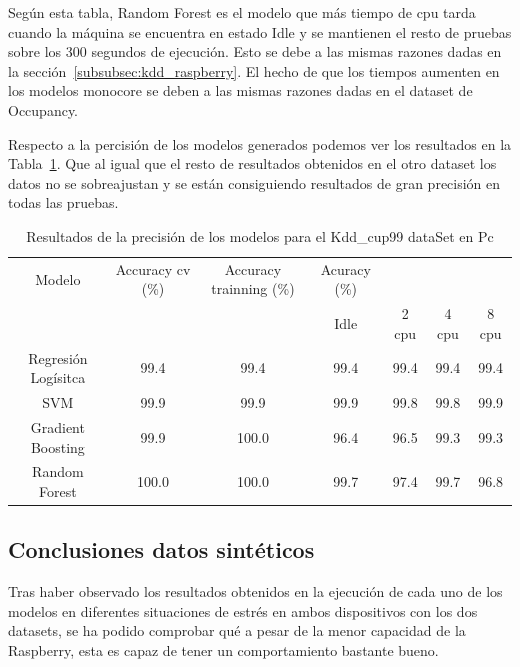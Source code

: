 \documentclass[a4paper, 12pt]{book}
\begin{document}
Según esta tabla, Random Forest es el modelo que más tiempo de cpu tarda cuando la máquina se encuentra en estado Idle y se mantienen el resto de pruebas sobre los 300 segundos de ejecución. Esto se debe a las mismas razones dadas en la sección~\ref{subsubsec:kdd_raspberry}. El hecho de que los tiempos aumenten en los modelos monocore se deben a las mismas razones dadas en el dataset de Occupancy.


Respecto a la percisión de los modelos generados podemos ver los resultados en la Tabla~\ref{tab:acc_Kddpc}. Que al igual que el resto de resultados obtenidos en el otro dataset los datos no se sobreajustan y se están consiguiendo resultados de gran precisión en todas las pruebas.

\begin{table}[]
\begin{adjustbox}{width=\textwidth}
\centering
    \begin{tabular}{c  c  c  c  c  c  c}
    \hline
    Modelo & Accuracy cv (\%) & Accuracy trainning (\%) & Acuracy (\%) & & & \\
    \cline{4-7}
     &  &   &  Idle & 2 cpu & 4 cpu & 8 cpu \\
     \hline
     Regresión Logísitca & 99.4 & 99.4 & 99.4 & 99.4 & 99.4 & 99.4\\
     SVM & 99.9 & 99.9 & 99.9 & 99.8 & 99.8 & 99.9\\
     Gradient Boosting & 99.9 & 100.0 & 96.4 & 96.5 & 99.3 & 99.3 \\
     Random Forest & 100.0 & 100.0 & 99.7 & 97.4 & 99.7 & 96.8\\
    \hline
    \end{tabular}
\end{adjustbox}
\caption{Resultados de la precisión de los modelos para el Kdd\_cup99 dataSet en Pc}
\label{tab:acc_Kddpc}
\end{table}

\subsection{Conclusiones datos sintéticos}
\label{subsec:conclusion_sinteticos}

Tras haber observado los resultados obtenidos en la ejecución de cada uno de los modelos en diferentes situaciones de estrés en ambos dispositivos con los dos datasets, se ha podido comprobar qué a pesar de la menor capacidad de la Raspberry, esta es capaz de tener un comportamiento bastante bueno.
\end{document}
